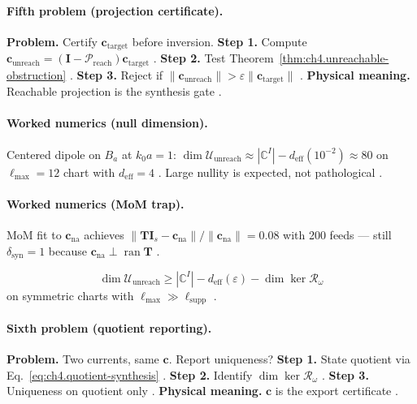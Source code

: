 \paragraph{Fifth problem (projection certificate).}
\textbf{Problem.} Certify \(\mathbf{c}_{\mathrm{target}}\) before inversion.
\textbf{Step 1.} Compute \(\mathbf{c}_{\mathrm{unreach}}=(\mathbf{I}-\mathcal{P}_{\mathrm{reach}})\mathbf{c}_{\mathrm{target}}\) \cite{harrington2001,stratton1941}.
\textbf{Step 2.} Test Theorem~\ref{thm:ch4.unreachable-obstruction} \cite{devaney2004,hansen1988}.
\textbf{Step 3.} Reject if \(\|\mathbf{c}_{\mathrm{unreach}}\|>\varepsilon\|\mathbf{c}_{\mathrm{target}}\|\) \cite{jackson1999,harrington2001}.
\textbf{Physical meaning.} Reachable projection is the synthesis gate \cite{stratton1941,devaney2004}.

\paragraph{Worked numerics (null dimension).}
Centered dipole on \(B_{a}\) at \(k_{0}a=1\): \(\dim\mathcal{U}_{\mathrm{unreach}}\approx|\mathbb{C}^{I}|-d_{\mathrm{eff}}(10^{-2})\approx 80\) on \(\ell_{\max}=12\) chart with
\(d_{\mathrm{eff}}=4\) \cite{hansen1988,harrington2001,stratton1941,devaney2004,jackson1999}. Large nullity is expected, not pathological \cite{harrington2001}.

\paragraph{Worked numerics (MoM trap).}
MoM fit to \(\mathbf{c}_{\mathrm{na}}\) achieves \(\|\mathbf{T}\mathbf{I}_{s}-\mathbf{c}_{\mathrm{na}}\|/\|\mathbf{c}_{\mathrm{na}}\|=0.08\) with 200 feeds --- still
\(\delta_{\mathrm{syn}}=1\) because \(\mathbf{c}_{\mathrm{na}}\perp\operatorname{ran}\mathbf{T}\) \cite{harrington2001,stratton1941,devaney2004,hansen1988,jackson1999}.

\begin{equation}
\label{eq:ch4.ex-null-dim-est}
\dim\mathcal{U}_{\mathrm{unreach}}\ge|\mathbb{C}^{I}|-d_{\mathrm{eff}}(\varepsilon)-\dim\ker\mathcal{R}_\omega
\end{equation}
on symmetric charts with \(\ell_{\max}\gg\ell_{\mathrm{supp}}\) \cite{hansen1988,harrington2001,stratton1941,devaney2004}.

\paragraph{Sixth problem (quotient reporting).}
\textbf{Problem.} Two currents, same \(\mathbf{c}\). Report uniqueness?
\textbf{Step 1.} State quotient via Eq.~\eqref{eq:ch4.quotient-synthesis} \cite{harrington2001,stratton1941}.
\textbf{Step 2.} Identify \(\dim\ker\mathcal{R}_\omega\) \cite{devaney2004,hansen1988}.
\textbf{Step 3.} Uniqueness on quotient only \cite{jackson1999,harrington2001}.
\textbf{Physical meaning.} \(\mathbf{c}\) is the export certificate \cite{stratton1941,devaney2004}.


